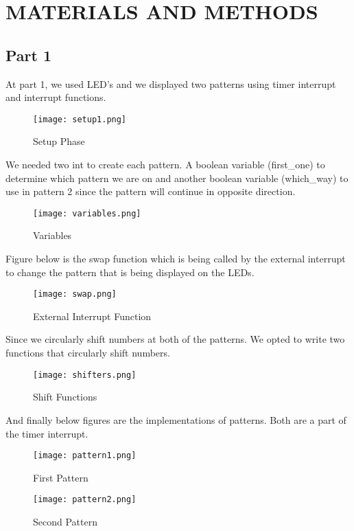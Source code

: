 \documentclass[pdftex,12pt,a4paper]{article}
\begin{document}
\section{MATERIALS AND METHODS}
\subsection{Part 1}
At part 1, we used LED's and we displayed two patterns using timer interrupt and interrupt functions. 
\begin{figure}[H]
	\centering
	\texttt{[image: setup1.png]}
	\label{fig1}
	\caption{Setup Phase}
\end{figure}
We needed two int to create each pattern. A boolean variable (first\_one) to determine which pattern we are on and another boolean variable (which\_way) to use in pattern 2 since the pattern will continue in opposite direction. 
\begin{figure}[H]
	\centering
	\texttt{[image: variables.png]}
	\caption{Variables}
\end{figure}
Figure below is the swap function which is being called by the external interrupt to change the pattern that is being displayed on the LEDs.
\newpage
\begin{figure}[H]
	\centering
	\texttt{[image: swap.png]}
	\label{fig3}
	\caption{External Interrupt Function}
\end{figure}
Since we circularly shift numbers at both of the patterns. We opted to write two functions that circularly shift numbers. 

\begin{figure}[H]
	\centering
	\texttt{[image: shifters.png]}
	\label{fig4}
	\caption{Shift Functions}
\end{figure}
And finally below figures are the implementations of patterns. Both are a part of the timer interrupt.

\begin{figure}[H]
	\centering
	\texttt{[image: pattern1.png]}
	\label{fig5}
	\caption{First Pattern}
\end{figure}

\begin{figure}[H]
	\centering
	\texttt{[image: pattern2.png]}
	\label{fig6}
	\caption{Second Pattern}
\end{figure}

\newpage
\end{document}
